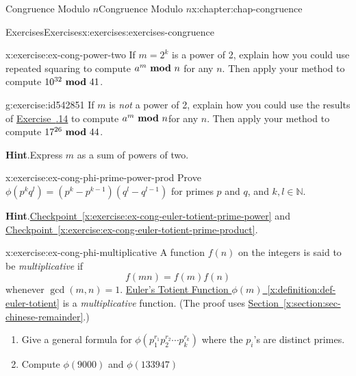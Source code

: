 \documentclass[oneside,10pt,]{book}
\newcommand{\blocktitlefont}{\relax}
\newcommand{\xreffont}{\relax}
\numberwithin{equation}{section}
\newcommand{\mmod}[1]{\ \mathrm{\bf mod}\ #1}
\begin{document}
\begin{chapterptx}{Congruence Modulo \(n\)}{}{Congruence Modulo \(n\)}{}{}{x:chapter:chap-congruence}
\begin{exercises-section}{Exercises}{}{Exercises}{}{}{x:exercises:exercises-congruence}
\begin{divisionexercise}{14}{}{}{x:exercise:ex-cong-power-two}
If \(m = 2^k\) is a power of 2, explain how you could use repeated squaring to compute \(a^m \mmod{n}\) for any \(n\). Then apply your method to compute \(10^{32} \mmod 41\).%
\end{divisionexercise}%
\begin{divisionexercise}{15}{}{}{g:exercise:id542851}%
If \(m\) is \emph{not} a power of 2, explain how you could use the results of \hyperlink{x:exercise:ex-cong-power-two}{Exercise~{\xreffont 4.6.14}} to compute \(a^m \mmod{n}\)for any \(n\). Then apply your method to compute \(17^{26} \mmod 44\).%
\par\smallskip%
\noindent\textbf{\blocktitlefont Hint}.\hypertarget{g:hint:id542843}{}\quad{}Express \(m\) as a sum of powers of two.%
\end{divisionexercise}%
\begin{divisionexercise}{16}{}{}{x:exercise:ex-cong-phi-prime-power-prod}%
Prove \(\phi(p^kq^l) = \left(p^k-p^{k-1}\right)\left(q^l - q^{l-1}\right)\) for primes \(p\) and \(q\), and \(k,l\in\mathbb{N}\).%
\par\smallskip%
\noindent\textbf{\blocktitlefont Hint}.\hypertarget{g:hint:id542897}{}\quad{}\hyperref[x:exercise:ex-cong-euler-totient-prime-power]{Checkpoint~{\xreffont\ref{x:exercise:ex-cong-euler-totient-prime-power}}} and \hyperref[x:exercise:ex-cong-euler-totient-prime-product]{Checkpoint~{\xreffont\ref{x:exercise:ex-cong-euler-totient-prime-product}}}.%
\end{divisionexercise}%
\begin{divisionexercise}{17}{}{}{x:exercise:ex-cong-phi-multiplicative}%
A function \(f(n)\) on the integers is said to be \emph{multiplicative} if%
\begin{equation*}
f(mn) = f(m)f(n)
\end{equation*}
whenever \(\gcd(m,n) = 1\). \hyperref[x:definition:def-euler-totient]{Euler's Totient Function \(\phi(m)\)~{\xreffont\ref{x:definition:def-euler-totient}}} is a \emph{multiplicative} function. (The proof uses \hyperref[x:section:sec-chinese-remainder]{Section~{\xreffont\ref{x:section:sec-chinese-remainder}}}.)%
\par
%
\begin{enumerate}[label=(\alph*)]
\item{}Give a general formula for \(\phi(p_1^{r_1}p_2^{r_2}\cdots p_k^{r_k})\) where the \(p_i\)'s are distinct primes.%
\item{}Compute \(\phi(9000)\) and \(\phi(133947)\)%
\end{enumerate}
%
\end{divisionexercise}%

\end{exercises-section}
\end{chapterptx}
\end{document}
